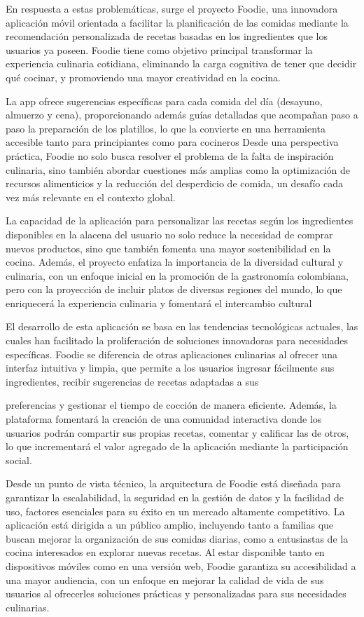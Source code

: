 \documentclass[a4paper,12pt]{article}
\begin{document}
En respuesta a estas problemáticas, surge el proyecto Foodie, una innovadora aplicación móvil orientada a facilitar la planificación de las comidas mediante la recomendación personalizada de recetas basadas en los ingredientes que los usuarios ya poseen. Foodie tiene como objetivo principal transformar la experiencia culinaria cotidiana, eliminando la carga cognitiva de tener que decidir qué cocinar, y promoviendo una mayor creatividad en la cocina.

La app ofrece sugerencias específicas para cada comida del día (desayuno, almuerzo y cena), proporcionando además guías detalladas que acompañan paso a paso la preparación de los platillos, lo que la convierte en una herramienta accesible tanto para principiantes como para cocineros
Desde una perspectiva práctica, Foodie no solo busca resolver el problema de la falta de inspiración culinaria, sino también abordar cuestiones más amplias como la optimización de recursos alimenticios y la reducción del desperdicio de comida, un desafío cada vez más relevante en el contexto global.

La capacidad de la aplicación para personalizar las recetas según los ingredientes disponibles en la alacena del usuario no solo reduce la necesidad de comprar nuevos productos, sino que también fomenta una mayor sostenibilidad en la cocina. Además, el proyecto enfatiza la importancia de la diversidad cultural y culinaria, con un enfoque inicial en la promoción de la gastronomía colombiana, pero con la proyección de incluir platos de diversas regiones del mundo, lo que enriquecerá la experiencia culinaria y fomentará el intercambio cultural

El desarrollo de esta aplicación se basa en las tendencias tecnológicas actuales, las cuales han facilitado la proliferación de soluciones innovadoras para necesidades específicas. Foodie se diferencia de otras aplicaciones culinarias al ofrecer una interfaz intuitiva y limpia, que permite a los usuarios ingresar fácilmente sus ingredientes, recibir sugerencias de recetas adaptadas a sus
 
preferencias y gestionar el tiempo de cocción de manera eficiente. Además, la plataforma fomentará la creación de una comunidad interactiva donde los usuarios podrán compartir sus propias recetas, comentar y calificar las de otros, lo que incrementará el valor agregado de la aplicación mediante la participación social.

Desde un punto de vista técnico, la arquitectura de Foodie está diseñada para garantizar la escalabilidad, la seguridad en la gestión de datos y la facilidad de uso, factores esenciales para su éxito en un mercado altamente competitivo. La aplicación está dirigida a un público amplio, incluyendo tanto a familias que buscan mejorar la organización de sus comidas diarias, como a entusiastas de la cocina interesados en explorar nuevas recetas. Al estar disponible tanto en dispositivos móviles como en una versión web, Foodie garantiza su accesibilidad a una mayor audiencia, con un enfoque en mejorar la calidad de vida de sus usuarios al ofrecerles soluciones prácticas y personalizadas para sus necesidades culinarias.
\end{document}
